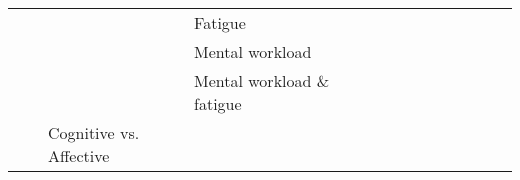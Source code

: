 \begin{tabular}{p{1.5cm}p{1.5cm}p{1.5cm}p{1.5cm}p{0.6cm}p{0.6cm}p{0.6cm}p{0.6cm}p{0.6cm}p{0.6cm}p{0.6cm}p{0.6cm}p{0.6cm}p{0.6cm}}
                                &                 &                   & Fatigue &                                                             &                                                                                                      \cite{Hajinoroozi2016} &                                                                        &                                      &                                                            &                      &                       &                                 &                         &                                                                      \\
                                &                 &                   & Mental workload &                                   \cite{Yin2017a, Yin2016b} &                                                                                              \cite{Almogbel2018, Zhang2017} &                                          \cite{Hefron2018, Kuanar2018} &                                      &                                                            &                      &                       &                                 &                         &                                                    \cite{Hefron2017} \\
                                &                 &                   & Mental workload \& fatigue &                                                             &                                                                                                                             &                                                                        &                       \cite{Yin2017} &                                                            &                      &                       &                                 &                         &                                                                      \\
                                &                 & Cognitive vs. Affective &   &                                                             &                                                                                                                             &                                                                        &                 \cite{Bashivan2016b} &                                                            &                      &                       &                                 &                         &                                                                      \\

\end{tabular}

